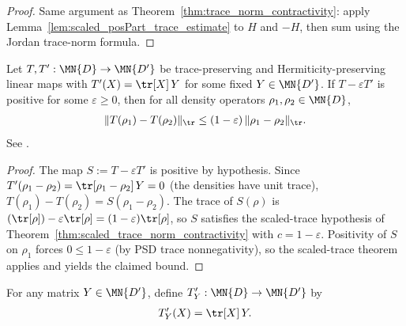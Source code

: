 \begin{proof}\leanok
    Same argument as Theorem~\ref{thm:trace_norm_contractivity}: apply
    Lemma~\ref{lem:scaled_posPart_trace_estimate} to $H$ and $-H$, then
    sum using the Jordan trace-norm formula.
\end{proof}

\begin{theorem}
    \label{thm:quantum_doeblin_contraction}
    \leanok
    Let $T,T':\MN{D}\to\MN{D'}$ be trace-preserving and
    Hermiticity-preserving linear maps with
    $T'(X)=\tr[X]\,Y$ for some fixed $Y\in\MN{D'}$.
    If $T-\varepsilon T'$ is positive for some $\varepsilon\geq0$, then
    for all density operators $\rho_1,\rho_2\in\MN{D}$,
    \begin{align}
        \lVert T(\rho_1)-T(\rho_2)\rVert_{\tr}
        \leq(1-\varepsilon)\,\lVert\rho_1-\rho_2\rVert_{\tr}.
        \label{eq:quantum_doeblin_contraction}
    \end{align}
    See \cite[Chapter~8, Theorem~8.17]{Wolf2012Quantum}.
\end{theorem}

\begin{proof}\leanok
    The map $S:=T-\varepsilon T'$ is positive by hypothesis.
    Since $T'(\rho_1-\rho_2)=\tr[\rho_1-\rho_2]\,Y=0$ (the densities
    have unit trace), $T(\rho_1)-T(\rho_2)=S(\rho_1-\rho_2)$. The trace
    of $S(\rho)$ is $(\tr[\rho])-\varepsilon\tr[\rho]=(1-\varepsilon)
    \tr[\rho]$, so $S$ satisfies the scaled-trace hypothesis of
    Theorem~\ref{thm:scaled_trace_norm_contractivity} with
    $c=1-\varepsilon$. Positivity of $S$ on $\rho_1$ forces
    $0\leq1-\varepsilon$ (by PSD trace nonnegativity), so the
    scaled-trace theorem applies and yields the claimed bound.
\end{proof}

\begin{definition}
    \label{def:trace_prepare_map}
    \leanok
    For any matrix $Y\in\MN{D'}$, define
    $T'_Y:\MN{D}\to\MN{D'}$ by
    \begin{align}
        T'_Y(X) = \tr[X]\,Y.
        \label{eq:trace_prepare_map}
    \end{align}
\end{definition}

